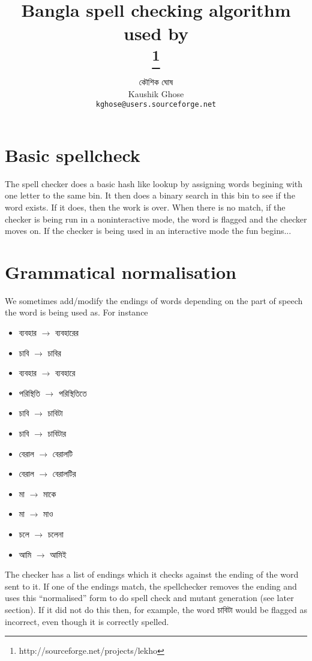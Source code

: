 \documentclass[11pt]{article}
\begin{document}
\title{Bangla spell checking algorithm used by\\ \footnote{http://sourceforge.net/projects/lekho}}
\author{ {\lbng কৌশিক ঘোষ}\\Kaushik Ghose\\{\tt kghose@users.sourceforge.net}}
\maketitle

\section{Basic spellcheck}
The spell checker does a basic hash like lookup by assigning words begining with one letter to the same bin. It then does a binary search in this bin to see if the word exists. If it does, then the work is over. When there is no match, if the checker is being run in a noninteractive mode, the word is flagged and the checker moves on. If the checker is being used in an interactive mode the fun begins... 

\section{Grammatical normalisation}
We sometimes add/modify the endings of words depending on the part of speech the word is being used as. For instance \begin{itemize}
\item {\lbng ব্যবহার} $\rightarrow$ {\lbng ব্যবহারের}
\item {\lbng চাবি} $\rightarrow$ {\lbng চাবির}
\item {\lbng ব্যবহার} $\rightarrow$ {\lbng ব্যবহারে}
\item {\lbng পরিস্থিতি} $\rightarrow$ {\lbng পরিস্থিতিতে}
\item {\lbng চাবি} $\rightarrow$ {\lbng চাবিটা}
\item {\lbng চাবি} $\rightarrow$ {\lbng চাবিটার}
\item {\lbng বেরাল} $\rightarrow$ {\lbng বেরালটি}
\item {\lbng বেরাল} $\rightarrow$ {\lbng বেরালটির}
\item {\lbng মা} $\rightarrow$ {\lbng মাকে}
\item {\lbng মা} $\rightarrow$ {\lbng মাও}
\item {\lbng চলে} $\rightarrow$ {\lbng চলেনা}
\item {\lbng আমি} $\rightarrow$ {\lbng আমিই}
\end{itemize}
The checker has a list of endings which it checks against the ending of the word sent to it. If one of the endings match, the spellchecker removes the ending and uses this ``normalised'' form to do spell check and mutant generation (see later section). If it did not do this then, for example, the word {\bng চাবিটা} would be flagged as incorrect, even though it is correctly spelled.
\end{document}
